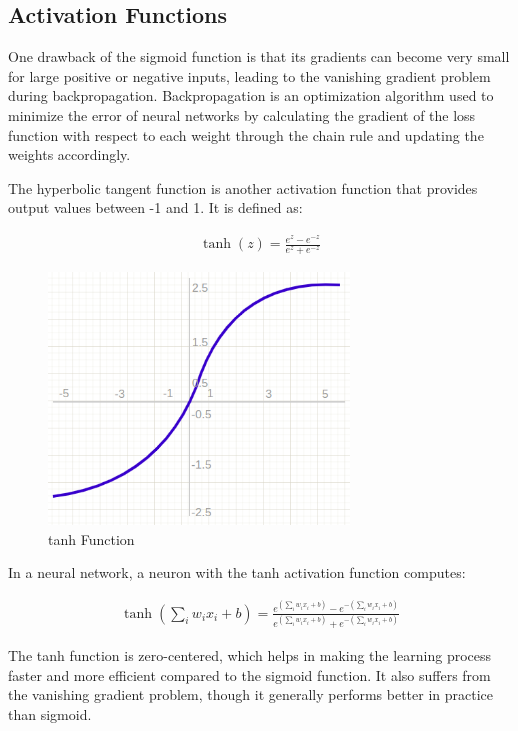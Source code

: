 \subsection{Activation Functions}

One drawback of the sigmoid function is that its gradients can become very small for large positive or negative inputs, leading to the vanishing gradient problem during backpropagation.
Backpropagation is an optimization algorithm used to minimize the error of neural networks by calculating the gradient of the loss function with respect to each weight through the chain rule and updating the weights accordingly.

The hyperbolic tangent function is another activation function that provides output values between -1 and 1.
It is defined as:

\begin{align}
  \tanh(z) = \frac{e^z - e^{-z}}{e^z + e^{-z}}
\end{align}

\begin{figure}[H]
  \centering
  \includegraphics[width=80mm]{figures/tanh.png}
  \caption{tanh Function}
  \label{tanh}
\end{figure}

In a neural network, a neuron with the tanh activation function computes:

\begin{align}
  \tanh(\sum_i w_i x_i + b) = \frac{e^{(\sum_i w_i x_i + b)} - e^{-(\sum_i w_i x_i + b)}}{e^{(\sum_i w_i x_i + b)} + e^{-(\sum_i w_i x_i + b)}}
\end{align}

The tanh function is zero-centered, which helps in making the learning process faster and more efficient compared to the sigmoid function.
It also suffers from the vanishing gradient problem, though it generally performs better in practice than sigmoid.

